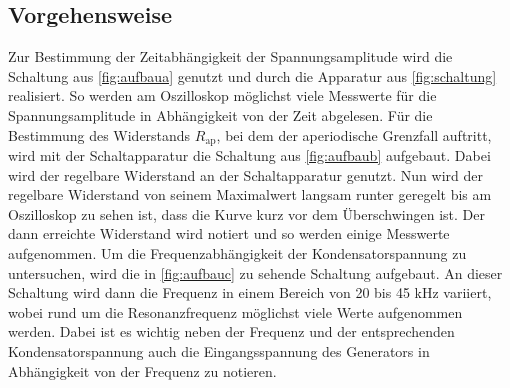 \subsection{Vorgehensweise}
Zur Bestimmung der Zeitabhängigkeit der Spannungsamplitude wird die Schaltung aus \autoref{fig:aufbaua} genutzt und durch die Apparatur aus \autoref{fig:schaltung} realisiert. So werden am Oszilloskop möglichst viele Messwerte für die Spannungsamplitude in Abhängigkeit von der Zeit abgelesen. \newline
Für die Bestimmung des Widerstands $R_{\text{ap}}$, bei dem der aperiodische Grenzfall auftritt, wird mit der Schaltapparatur die Schaltung aus \autoref{fig:aufbaub} aufgebaut. Dabei wird der regelbare Widerstand an der Schaltapparatur genutzt. Nun wird der regelbare Widerstand von seinem Maximalwert langsam runter geregelt bis am Oszilloskop zu sehen ist, dass die Kurve kurz vor dem Überschwingen ist. Der dann erreichte Widerstand wird notiert und so werden einige Messwerte aufgenommen.\newline
Um die Frequenzabhängigkeit der Kondensatorspannung zu untersuchen, wird die in \autoref{fig:aufbauc} zu sehende Schaltung aufgebaut. An dieser Schaltung wird dann die Frequenz in einem Bereich von 20 bis 45 kHz variiert, wobei rund um die Resonanzfrequenz möglichst viele Werte aufgenommen werden. Dabei ist es wichtig neben der Frequenz und der entsprechenden Kondensatorspannung auch die Eingangsspannung des Generators in Abhängigkeit von der Frequenz zu notieren.